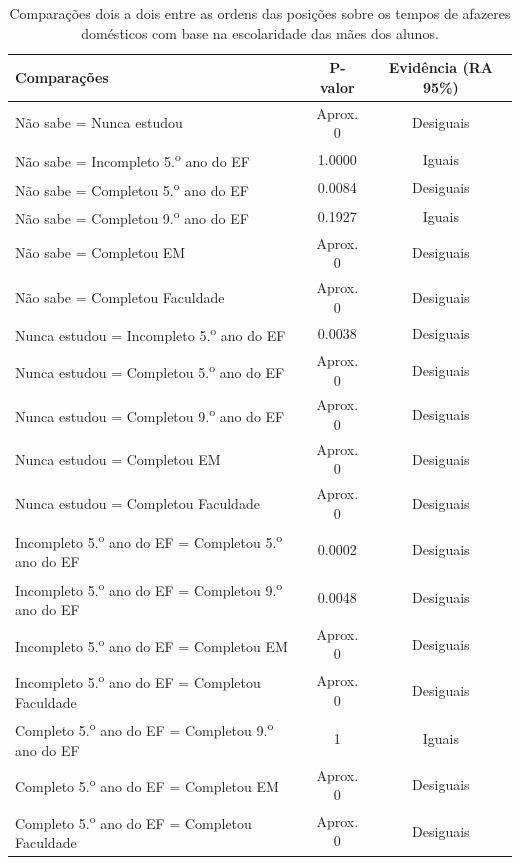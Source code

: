 \newpage
\begin{table}[htb]
    \centering
\caption{Comparações dois a dois entre as ordens das posições sobre os tempos de afazeres domésticos
com base na escolaridade das mães dos alunos.\label{tab:esc_mae_afzr}}
    \begin{tabular}{lcc}
    \toprule
    Comparações & P-valor & Evidência (RA 95\%)\\
    \midrule \midrule
    Não sabe = Nunca estudou & Aprox. 0 & Desiguais\\
    Não sabe = Incompleto 5.\textsuperscript{o} ano do EF  & 1.0000 & Iguais\\
    Não sabe = Completou 5.\textsuperscript{o} ano do EF  & 0.0084 & Desiguais\\
    Não sabe = Completou 9.\textsuperscript{o} ano do EF  & 0.1927 & Iguais\\
    Não sabe = Completou EM & Aprox. 0 & Desiguais\\
    Não sabe = Completou Faculdade & Aprox. 0 & Desiguais\\
    Nunca estudou = Incompleto 5.\textsuperscript{o} ano do EF  & 0.0038 & Desiguais\\
    Nunca estudou = Completou 5.\textsuperscript{o} ano do EF  & Aprox. 0 & Desiguais\\
    Nunca estudou = Completou 9.\textsuperscript{o} ano do EF  & Aprox. 0 & Desiguais\\
    Nunca estudou = Completou EM & Aprox. 0 & Desiguais\\
    Nunca estudou = Completou Faculdade & Aprox. 0 & Desiguais\\
    Incompleto 5.\textsuperscript{o} ano do EF = Completou 5.\textsuperscript{o} ano do EF  & 0.0002 & Desiguais\\
    Incompleto 5.\textsuperscript{o} ano do EF = Completou 9.\textsuperscript{o} ano do EF  & 0.0048 & Desiguais\\
    Incompleto 5.\textsuperscript{o} ano do EF = Completou EM & Aprox. 0 & Desiguais\\
    Incompleto 5.\textsuperscript{o} ano do EF = Completou Faculdade & Aprox. 0 & Desiguais\\
    Completo 5.\textsuperscript{o} ano do EF = Completou 9.\textsuperscript{o} ano do EF  & 1 & Iguais\\
    Completo 5.\textsuperscript{o} ano do EF = Completou EM & Aprox. 0 & Desiguais\\
    Completo 5.\textsuperscript{o} ano do EF = Completou Faculdade & Aprox. 0 & Desiguais\\

\end{tabular}
\end{table}

